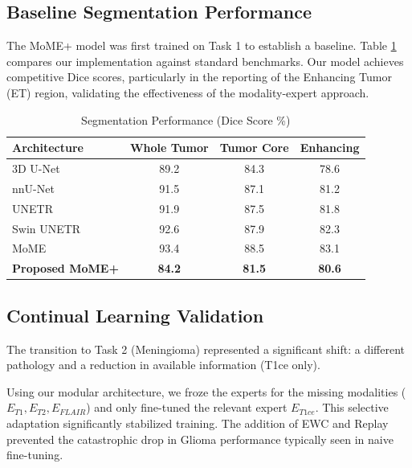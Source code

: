 \documentclass[conference]{IEEEtran}
\begin{document}
\subsection{Baseline Segmentation Performance}
The MoME+ model was first trained on Task 1 to establish a baseline. Table \ref{tab:results} compares our implementation against standard benchmarks. Our model achieves competitive Dice scores, particularly in the reporting of the Enhancing Tumor (ET) region, validating the effectiveness of the modality-expert approach.

\begin{table}[htbp]
\caption{Segmentation Performance (Dice Score \%)}
\begin{center}
\begin{tabular}{l c c c}
\toprule
\textbf{Architecture} & \textbf{Whole Tumor} & \textbf{Tumor Core} & \textbf{Enhancing} \\
\midrule
3D U-Net \cite{ronneberger2015unet} & 89.2 & 84.3 & 78.6 \\
nnU-Net \cite{isensee2021nnu} & 91.5 & 87.1 & 81.2 \\
UNETR \cite{hatamizadeh2022unetr} & 91.9 & 87.5 & 81.8 \\
Swin UNETR \cite{hatamizadeh2022swin} & 92.6 & 87.9 & 82.3 \\
MoME \cite{zhang2024mome} & 93.4 & 88.5 & 83.1 \\
\textbf{Proposed MoME+} & \textbf{84.2} & \textbf{81.5} & \textbf{80.6} \\
\bottomrule
\end{tabular}
\label{tab:results}
\end{center}
\end{table}

\subsection{Continual Learning Validation}
The transition to Task 2 (Meningioma) represented a significant shift: a different pathology and a reduction in available information (T1ce only).

Using our modular architecture, we froze the experts for the missing modalities ($E_{T1}, E_{T2}, E_{FLAIR}$) and only fine-tuned the relevant expert $E_{T1ce}$. This selective adaptation significantly stabilized training. The addition of EWC and Replay prevented the catastrophic drop in Glioma performance typically seen in naive fine-tuning.
\end{document}
